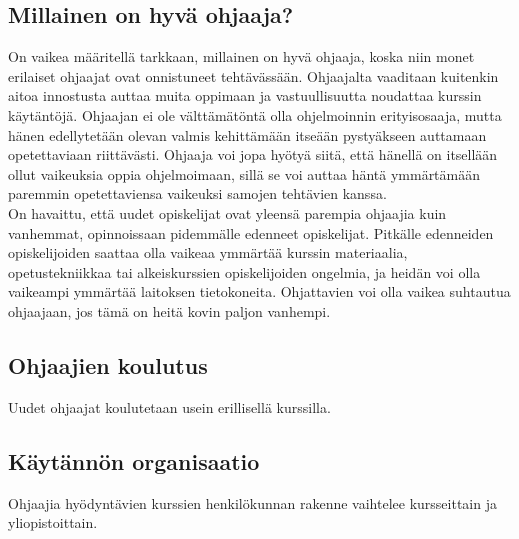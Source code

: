 \documentclass[finnish]{tktltiki2}
\theoremstyle{definition}
\theoremstyle{remark}
\begin{document}
\subsection{Millainen on hyvä ohjaaja?}
On vaikea määritellä tarkkaan, millainen on hyvä ohjaaja, koska niin monet erilaiset ohjaajat ovat onnistuneet tehtävässään. Ohjaajalta vaaditaan kuitenkin aitoa innostusta auttaa muita oppimaan ja vastuullisuutta noudattaa kurssin käytäntöjä. Ohjaajan ei ole välttämätöntä olla ohjelmoinnin erityisosaaja, mutta hänen edellytetään olevan valmis kehittämään itseään pystyäkseen auttamaan opetettaviaan riittävästi.\cite{Reges88} Ohjaaja voi jopa hyötyä siitä, että hänellä on itsellään ollut vaikeuksia oppia ohjelmoimaan, sillä se voi auttaa häntä ymmärtämään paremmin opetettaviensa vaikeuksi samojen tehtävien kanssa.\cite{Decker06}
\\
On havaittu, että uudet opiskelijat ovat yleensä parempia ohjaajia kuin vanhemmat, opinnoissaan pidemmälle edenneet opiskelijat. Pitkälle edenneiden opiskelijoiden saattaa olla vaikeaa ymmärtää kurssin materiaalia, opetustekniikkaa tai alkeiskurssien opiskelijoiden ongelmia, ja heidän voi olla vaikeampi ymmärtää laitoksen tietokoneita.\cite{Reges88} Ohjattavien voi olla vaikea suhtautua ohjaajaan, jos tämä on heitä kovin paljon vanhempi.\cite{Decker06}



\subsection{Ohjaajien koulutus}

Uudet ohjaajat koulutetaan usein erillisellä kurssilla. 




\subsection{Käytännön organisaatio}

Ohjaajia hyödyntävien kurssien henkilökunnan rakenne vaihtelee kursseittain ja yliopistoittain. 
\end{document}
